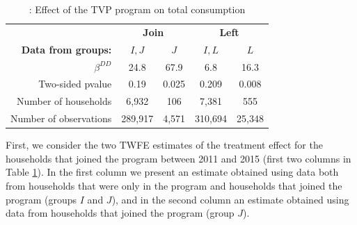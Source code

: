 \documentclass[12pt]{article}
\begin{document}
\begin{table}[h]
\centering
\caption{: Effect of the TVP program on total consumption}
\label{tab:estimates}
\begin{tabular}{@{}rcccc@{}}
\multicolumn{1}{l}{\textbf{}} & \multicolumn{2}{c}{\textbf{Join}} & \multicolumn{2}{c}{\textbf{Left}} \\
\textbf{Data from groups:}    & \textbf{$I,J$}   & \textbf{$J$}   & \textbf{$I,L$}   & \textbf{$L$}   \\ \midrule
$\beta^{DD}$           & 24.8    & 67.9  & 6.8     & 16.3   \\
Two-sided pvalue       & 0.19    & 0.025 & 0.209   & 0.008  \\ \midrule
Number of households   & 6,932   & 106   & 7,381   & 555    \\
Number of observations & 289,917 & 4,571 & 310,694 & 25,348
\end{tabular}
\end{table}

First, we consider the two TWFE estimates of the treatment effect for the households that joined the program between 2011 and 2015 (first two columns in Table \ref{tab:estimates}). In the first column we present an estimate obtained using data both from households that were only in the program and households that joined the program (groups $I$ and $J$), and in the second column an estimate obtained using data from households that joined the program (group $J$).
\end{document}
